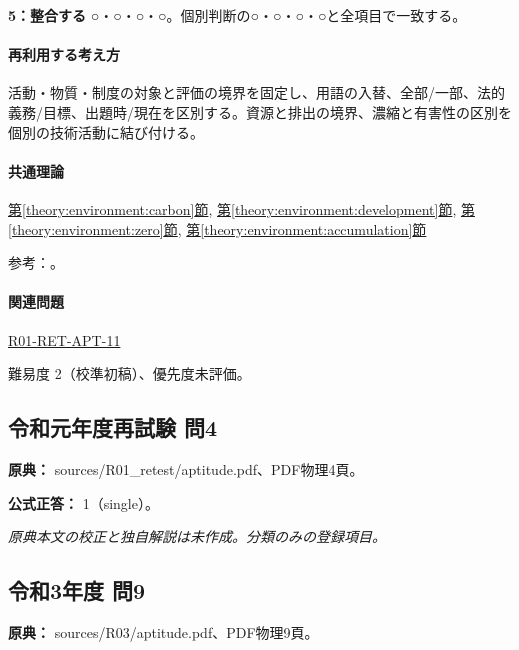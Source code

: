 \noindent\textbf{5：整合する} ○・○・○・○。個別判断の○・○・○・○と全項目で一致する。\par

\paragraph{再利用する考え方} 活動・物質・制度の対象と評価の境界を固定し、用語の入替、全部/一部、法的義務/目標、出題時/現在を区別する。資源と排出の境界、濃縮と有害性の区別を個別の技術活動に結び付ける。

\paragraph{共通理論} \hyperref[theory:environment:carbon]{第\ref*{theory:environment:carbon}節}, \hyperref[theory:environment:development]{第\ref*{theory:environment:development}節}, \hyperref[theory:environment:zero]{第\ref*{theory:environment:zero}節}, \hyperref[theory:environment:accumulation]{第\ref*{theory:environment:accumulation}節}

\par 参考：\cite{env_offset2008,env_development,env_zero2008,env_accumulation}。

\paragraph{関連問題} \hyperref[q:r01-ret-apt-11]{R01-RET-APT-11}

\par 難易度 2（校準初稿）、優先度未評価。

\subsection{令和元年度再試験 問4}
\label{q:r01-ret-apt-04}

\noindent\textbf{原典：} sources/R01\_retest/aptitude.pdf、PDF物理4頁。

\textbf{公式正答：} 1（single）。

\par\textit{原典本文の校正と独自解説は未作成。分類のみの登録項目。}

\subsection{令和3年度 問9}
\label{q:r03-reg-apt-09}

\noindent\textbf{原典：} sources/R03/aptitude.pdf、PDF物理9頁。

